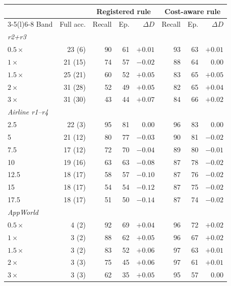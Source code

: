 \begin{tabular}{@{}lrrrrrrr@{}}
\toprule
 & & \multicolumn{3}{c}{Registered rule} & \multicolumn{3}{c}{Cost-aware rule} \\
\cmidrule(lr){3-5}\cmidrule(l){6-8}
Band & Full acc. & Recall & Ep. & $\Delta D$ & Recall & Ep. & $\Delta D$ \\
\midrule
\multicolumn{8}{l}{\emph{r2+r3}} \\
$0.5\times$ & 23 (6) & 90 & 61 & $+0.01$ & 93 & 63 & $+0.01$ \\
$1\times$ & 21 (15) & 74 & 57 & $-0.02$ & 88 & 64 & $0.00$ \\
$1.5\times$ & 25 (21) & 60 & 52 & $+0.05$ & 83 & 65 & $+0.05$ \\
$2\times$ & 31 (28) & 52 & 49 & $+0.05$ & 82 & 65 & $+0.04$ \\
$3\times$ & 31 (30) & 43 & 44 & $+0.07$ & 84 & 66 & $+0.02$ \\
\multicolumn{8}{l}{\emph{Airline r1--r4}} \\
2.5 & 22 (3) & 95 & 81 & $0.00$ & 96 & 83 & $0.00$ \\
5 & 21 (12) & 80 & 77 & $-0.03$ & 90 & 81 & $-0.02$ \\
7.5 & 17 (12) & 72 & 70 & $-0.04$ & 89 & 80 & $-0.01$ \\
10 & 19 (16) & 63 & 63 & $-0.08$ & 87 & 78 & $-0.02$ \\
12.5 & 18 (17) & 58 & 57 & $-0.10$ & 87 & 76 & $-0.02$ \\
15 & 18 (17) & 54 & 54 & $-0.12$ & 87 & 75 & $-0.02$ \\
17.5 & 18 (17) & 51 & 50 & $-0.14$ & 87 & 74 & $-0.02$ \\
\multicolumn{8}{l}{\emph{AppWorld}} \\
$0.5\times$ & 4 (2) & 92 & 69 & $+0.04$ & 96 & 72 & $+0.02$ \\
$1\times$ & 3 (2) & 88 & 62 & $+0.05$ & 96 & 67 & $+0.02$ \\
$1.5\times$ & 3 (2) & 83 & 52 & $+0.06$ & 97 & 63 & $+0.01$ \\
$2\times$ & 3 (3) & 75 & 45 & $+0.06$ & 97 & 61 & $+0.01$ \\
$3\times$ & 3 (3) & 62 & 35 & $+0.05$ & 95 & 57 & $0.00$ \\
\bottomrule
\end{tabular}
